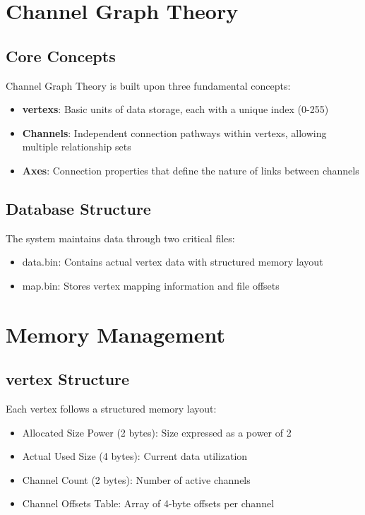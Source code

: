 \section{Channel Graph Theory}\label{Sec:Theory}
\subsection{Core Concepts}
Channel Graph Theory is built upon three fundamental concepts:
\begin{itemize}
    \item \textbf{vertexs}: Basic units of data storage, each with a unique index (0-255)
    \item \textbf{Channels}: Independent connection pathways within vertexs, allowing multiple relationship sets
    \item \textbf{Axes}: Connection properties that define the nature of links between channels
\end{itemize}

\subsection{Database Structure}
The system maintains data through two critical files:
\begin{itemize}
    \item data.bin: Contains actual vertex data with structured memory layout
    \item map.bin: Stores vertex mapping information and file offsets
\end{itemize}

\section{Memory Management}\label{Sec:Memory}
\subsection{vertex Structure}
Each vertex follows a structured memory layout:
\begin{itemize}
    \item Allocated Size Power (2 bytes): Size expressed as a power of 2
    \item Actual Used Size (4 bytes): Current data utilization
    \item Channel Count (2 bytes): Number of active channels
    \item Channel Offsets Table: Array of 4-byte offsets per channel
\end{itemize}

